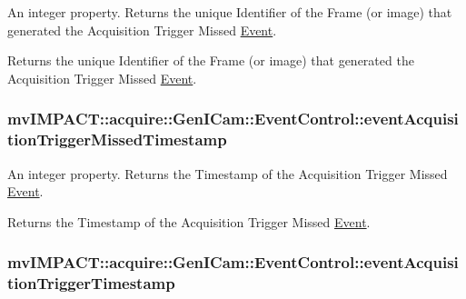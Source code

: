 An integer property. Returns the unique Identifier of the Frame (or image) that generated the Acquisition Trigger Missed \hyperlink{classmv_i_m_p_a_c_t_1_1acquire_1_1_event}{Event}. 

Returns the unique Identifier of the Frame (or image) that generated the Acquisition Trigger Missed \hyperlink{classmv_i_m_p_a_c_t_1_1acquire_1_1_event}{Event}. \hypertarget{classmv_i_m_p_a_c_t_1_1acquire_1_1_gen_i_cam_1_1_event_control_ada1bb3e40d2a409b3fe5cef941298c2b}{
\subsubsection[{event\+Acquisition\+Trigger\+Missed\+Timestamp}]{ mv\+I\+M\+P\+A\+C\+T\+::acquire\+::\+Gen\+I\+Cam\+::\+Event\+Control\+::event\+Acquisition\+Trigger\+Missed\+Timestamp}}\label{classmv_i_m_p_a_c_t_1_1acquire_1_1_gen_i_cam_1_1_event_control_ada1bb3e40d2a409b3fe5cef941298c2b}


An integer property. Returns the Timestamp of the Acquisition Trigger Missed \hyperlink{classmv_i_m_p_a_c_t_1_1acquire_1_1_event}{Event}. 

Returns the Timestamp of the Acquisition Trigger Missed \hyperlink{classmv_i_m_p_a_c_t_1_1acquire_1_1_event}{Event}. \hypertarget{classmv_i_m_p_a_c_t_1_1acquire_1_1_gen_i_cam_1_1_event_control_a5caef4334291b2db71faaa2a06949d3b}{
\subsubsection[{event\+Acquisition\+Trigger\+Timestamp}]{ mv\+I\+M\+P\+A\+C\+T\+::acquire\+::\+Gen\+I\+Cam\+::\+Event\+Control\+::event\+Acquisition\+Trigger\+Timestamp}}\label{classmv_i_m_p_a_c_t_1_1acquire_1_1_gen_i_cam_1_1_event_control_a5caef4334291b2db71faaa2a06949d3b}


